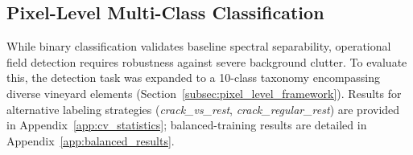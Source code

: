 \begin{landscape}
\thispagestyle{plain}
\section{Pixel-Level Multi-Class Classification}
\label{sec:pixel-multiclass}

\noindent
While binary classification validates baseline spectral separability, operational field detection requires robustness against severe background clutter. To evaluate this, the detection task was expanded to a 10-class taxonomy encompassing diverse vineyard elements (Section~\ref{subsec:pixel_level_framework}). Results for alternative labeling strategies (\textit{crack\_vs\_rest}, \textit{crack\_regular\_rest}) are provided in Appendix~\ref{app:cv_statistics}; balanced-training results are detailed in Appendix~\ref{app:balanced_results}.


\end{landscape}
